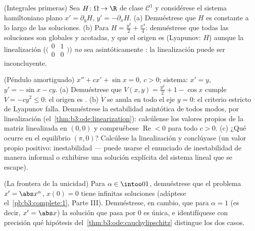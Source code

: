 \begin{exercise}[$\star\star$]\label{exo:b3:ode:7}
(Integrales primeras) Sea $H \colon \Omega \to \R$ de clase $\mathcal
C^1$ y considérese el sistema hamiltoniano plano $x' =
\partial_yH$, $y' = -\partial_xH$. (a) Demuéstrese que $H$ es constante
a lo largo de las soluciones. (b) Para $H = \frac{y^2}2 + \frac{x^4}4$:
demuéstrese que todas las soluciones son globales y acotadas, y que el
origen es  (Lyapunov: $H$) aunque
la linealización
($\bigl(\begin{smallmatrix}0&1\\0&0\end{smallmatrix}\bigr)$)
\emph{no} sea asintóticamente : la
linealización puede ser inconcluyente.
\end{exercise}

\begin{exercise}[$\star\star\star$]\label{exo:b3:ode:8}
(Péndulo amortiguado) $x'' + cx' + \sin x = 0$, $c > 0$; sistema:
$x' = y$, $y' = -\sin x - cy$.
(a) Demuéstrese que $V(x, y) = \frac{y^2}2 + 1 - \cos x$ cumple $\dot
V = -cy^2 \leq 0$: el origen es .
(b) $\dot V$ se anula en todo el eje $y = 0$: el criterio estricto de
Lyapunov falla. Demuéstrese la estabilidad asintótica de todos modos,
por linealización (el~\cref{thm:b3:ode:linearization}): calcúlense los
valores propios de la matriz linealizada en $(0,0)$ y compruébese
$\operatorname{Re} < 0$ para todo $c > 0$. (c) ¿Qué ocurre en el
equilibrio $(\pi, 0)$? Calcúlese la linealización y conclúyase (un valor
propio positivo: inestabilidad --- puede usarse el enunciado de
inestabilidad de manera informal o exhibirse una solución explícita del
sistema lineal que se escape).
\end{exercise}

\begin{exercise}[$\star\star$]\label{exo:b3:ode:9}
(La frontera de la unicidad) Para $\alpha \in \intoo01$, demuéstrese que
el problema $x' = \abs x^{\alpha}$, $x(0) = 0$ tiene infinitas
soluciones (adáptese el~\cref{pb:b3:complete:1}, Parte III).
Demuéstrese, en cambio, que para $\alpha = 1$ (es decir, $x' = \abs
x$) la solución que pasa por $0$ es única, e identifíquese con precisión
qué hipótesis del~\cref{thm:b3:ode:cauchylipschitz} distingue los dos
casos.
\end{exercise}

